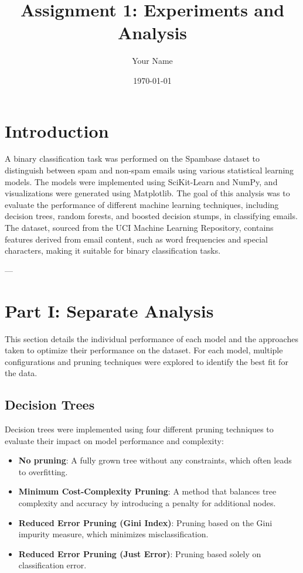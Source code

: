 \documentclass[12pt]{article}
\title{Assignment 1: Experiments and Analysis}
\author{Your Name}
\date{\today}
\begin{document}
\maketitle
\tableofcontents
\newpage

\section{Introduction}
A binary classification task was performed on the Spambase dataset to distinguish between spam and non-spam emails using various statistical learning models. The models were implemented using SciKit-Learn and NumPy, and visualizations were generated using Matplotlib. The goal of this analysis was to evaluate the performance of different machine learning techniques, including decision trees, random forests, and boosted decision stumps, in classifying emails. The dataset, sourced from the UCI Machine Learning Repository, contains features derived from email content, such as word frequencies and special characters, making it suitable for binary classification tasks.

---

\section{Part I: Separate Analysis}
This section details the individual performance of each model and the approaches taken to optimize their performance on the dataset. For each model, multiple configurations and pruning techniques were explored to identify the best fit for the data.

\subsection{Decision Trees}
Decision trees were implemented using four different pruning techniques to evaluate their impact on model performance and complexity:
\begin{itemize}
    \item \textbf{No pruning}: A fully grown tree without any constraints, which often leads to overfitting.
    \item \textbf{Minimum Cost-Complexity Pruning}: A method that balances tree complexity and accuracy by introducing a penalty for additional nodes.
    \item \textbf{Reduced Error Pruning (Gini Index)}: Pruning based on the Gini impurity measure, which minimizes misclassification.
    \item \textbf{Reduced Error Pruning (Just Error)}: Pruning based solely on classification error.
\end{itemize}
\end{document}
